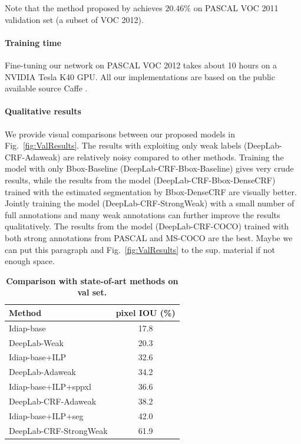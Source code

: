 Note that the method proposed by \citet{pathak2014fully} achieves $20.46\%$ on PASCAL VOC 2011 validation set (a subset of VOC 2012).

\paragraph{Training time} Fine-tuning our network on PASCAL VOC 2012 takes about 10
hours on a NVIDIA Tesla K40 GPU. All our implementations are based on the public available source Caffe \citep{jia2014caffe}.

\paragraph{Qualitative results} We provide visual comparisons between our proposed models in Fig.~\ref{fig:ValResults}. The results with exploiting only weak labels (DeepLab-CRF-Adaweak) are relatively noisy compared to other methods. Training the model with only Bbox-Baseline (DeepLab-CRF-Bbox-Baseline) gives very crude results, while the results from the model (DeepLab-CRF-Bbox-DenseCRF) trained with the estimated segmentation by Bbox-DenseCRF are visually better. Jointly training the model (DeepLab-CRF-StrongWeak) with a small number of full annotations and many weak annotations can further improve the results qualitatively. The results from the model (DeepLab-CRF-COCO) trained with both strong annotations from PASCAL and MS-COCO are the best. {\color{blue} Maybe we can put this paragraph and Fig.~\ref{fig:ValResults} to the sup. material if not enough space.}

\begin{table}
  \centering
  \caption{{\bf Comparison with state-of-art methods on val set.}}
  \begin{tabular}{l|c}
    {\bf Method} & pixel IOU (\%) \\
    \hline \hline
    Idiap-base   & 17.8 \\
    DeepLab-Weak & 20.3 \\
    \hline \hline
    Idiap-base+ILP  & 32.6 \\
    DeepLab-Adaweak & 34.2 \\
    \hline \hline
    Idiap-base+ILP+sppxl & 36.6 \\
    DeepLab-CRF-Adaweak  & 38.2 \\
    \hline \hline
    Idiap-base+ILP+seg       & 42.0 \\
    DeepLab-CRF-StrongWeak   & 61.9 \\
  \end{tabular}
  \label{tab:weak_state_of_art_val}
\end{table}


